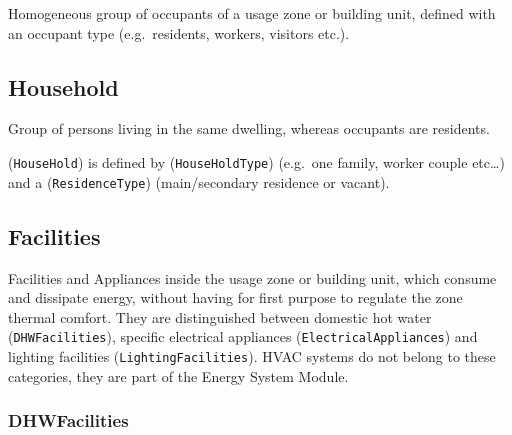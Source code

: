 \documentclass[a4paper,12pt]{article}
\begin{document}
Homogeneous group of occupants of a usage zone or building unit, defined
with an occupant type (e.g.~residents, workers, visitors etc.).

\subsection{Household}\label{household}

Group of persons living in the same dwelling, whereas occupants are
residents.

(\texttt{HouseHold}) is defined by (\texttt{HouseHoldType}) (e.g.~one
family, worker couple etc\ldots{}) and a (\texttt{ResidenceType})
(main/secondary residence or vacant).

\subsection{Facilities}\label{facilities}

Facilities and Appliances inside the usage zone or building unit, which
consume and dissipate energy, without having for first purpose to
regulate the zone thermal comfort. They are distinguished between
domestic hot water (\texttt{DHWFacilities}), specific electrical
appliances (\texttt{ElectricalAppliances}) and lighting facilities
(\texttt{LightingFacilities}). HVAC systems do not belong to these
categories, they are part of the Energy System Module.

\subsubsection{DHWFacilities}\label{dhwfacilities}
\end{document}
